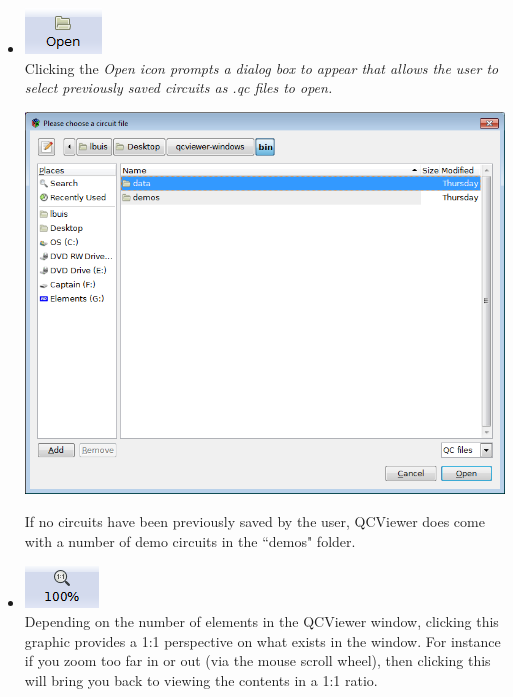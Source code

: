 \documentclass[10pt]{article}
\theoremstyle{definition}
\begin{document}
\begin{itemize}
\item \includegraphics{Figures/Navigation/Open.png} \\ 

Clicking the \em Open \em icon prompts a dialog box to appear that allows the user to select previously saved circuits as .qc files to open.

\begin{center}
\includegraphics[scale=0.75]{Figures/Navigation/OpenDialog.png}
\end{center}

If no circuits have been previously saved by the user, QCViewer does come with a number of demo circuits in the ``demos" folder. 

\item \includegraphics{Figures/Navigation/Ratio.png}\\ 

Depending on the number of elements in the QCViewer window, clicking this graphic provides a 1:1 perspective on what exists in the window. For instance if you zoom too far in or out (via the mouse scroll wheel), then clicking this will bring you back to viewing the contents in a 1:1 ratio. 


\end{itemize}
\end{document}
